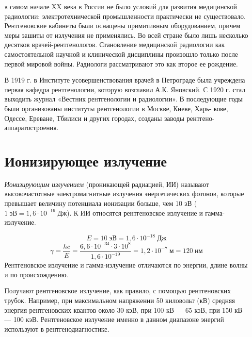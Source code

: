 \documentclass[14pt,a4paper]{article}
\begin{document}
в самом начале XX века в России не было условий для развития медицинской радиологии: электротехнической промышленности практически не существовало. Рентгеновские кабинеты были оснащены примитивным оборудованием, причем меры зашиты от излучения не применялись. Во всей стране было лишь несколько десятков врачей-рентгенологов.
Становление медицинской радиологии как самостоятельной научной и
клинической дисциплины произошло только после первой мировой войны.
Радиологи рассматривают это как второе ее рождение.

В 1919 г. в Институте усовершенствования врачей в Петрограде была учреждена первая
кафедра рентгенологии, которую возглавил А.К. Яновский. С 1920 г. стал
выходить журнал «Вестник рентгенологии и радиологии». В последующие
годы были организованы институты рентгенологии в Москве, Киеве, Харь-
кове, Одессе, Ереване, Тбилиси и других городах, созданы заводы рентгено-
аппаратостроения.
\section{Ионизирующее излучение}
\emph{Ионизирующим излучением} (проникающей радиацией, ИИ) называют
высокочастотные электромагнитные излучения энергетических фотонов, которые
превышает величину потенциала ионизации больше, чем 10 эВ ($1\;\text{эВ} = 1,6 \cdot 10^{-19}\;\text{Дж}$). К ИИ относятся рентгеновское излучение и гамма-излучение.

\[ E = 10\;\text{эВ} = 1,6 \cdot 10^{-18}\;\text{Дж}\]
\[ \gamma = \frac{hc}{E} = \frac{6,6\cdot 10^{-34} \cdot 3 \cdot 10^8}{1,6 \cdot 10^{-19}} = 1,2 \cdot 10^{-7}\;\text{м} = 120\;\text{нм}\]
Рентгеновское излучение и гамма-излучение отличаются по энергии, длине
волны и по происхождению.

Получают рентгеновское излучение, как правило, с помощью рентгеновских трубок. Например, при максимальном напряжении 50 киловольт (кВ) средняя энергия рентгеновских квантов около
30 кэВ, при 100 кВ — 65 кэВ, при 150 кВ — 100 кэВ. Рентгеновское излучение именно в данном диапазоне энергий используют в рентгенодиагностике.

\end{document}

